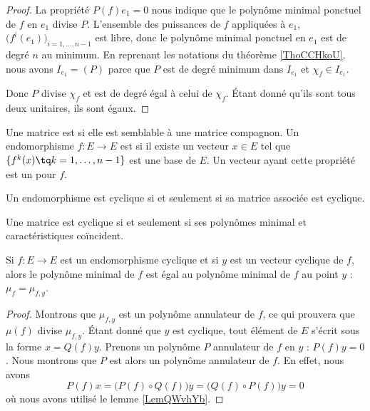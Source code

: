 \begin{proof}
    La propriété \( P(f)e_1=0\) nous indique que le polynôme minimal ponctuel de \( f\) en \( e_1\) divise \( P\). L'ensemble des puissances de \( f\) appliquées à \( e_1\), \( \big( f^i(e_1) \big)_{i=1,\ldots, n-1}\) est libre, donc le polynôme minimal ponctuel en \( e_1\) est de degré \( n\) au minimum. En reprenant les notations du théorème \ref{ThoCCHkoU}, nous avons \( I_{e_1}=(P)\) parce que \( P\) est de degré minimum dans \( I_{e_1}\) et \( \chi_f\in I_{e_1}\).

    Donc \( P\) divise \( \chi_f\) et est de degré égal à celui de \( \chi_f\). Étant donné qu'ils sont tous deux unitaires, ils sont égaux.
\end{proof}

\begin{definition}
    Une matrice est  si elle est semblable à une matrice compagnon. Un endomorphisme \( f\colon E\to E\) est  si il existe un vecteur \( x\in E\) tel que \( \{ f^k(x)\tq k=1,\ldots, n-1 \}\) est une base de \( E\). Un vecteur ayant cette propriété est un  pour \( f\).
\end{definition}

\begin{lemma}
    Un endomorphisme est cyclique si et seulement si sa matrice associée est cyclique.
\end{lemma}

\begin{lemma}   \label{LemSGmdnE}
    Une matrice est cyclique si et seulement si ses polynômes minimal et caractéristiques coïncident.
\end{lemma}

\begin{lemma}   \label{LemAGZNNa}
    Si \( f\colon E\to E\) est un endomorphisme cyclique et si \( y\) est un vecteur cyclique de \( f\), alors le polynôme minimal de \( f\) est égal au polynôme minimal de \( f\) au point \( y\) : \( \mu_{f}=\mu_{f,y}\).
\end{lemma}

\begin{proof}
    Montrons que \( \mu_{f,y}\) est un polynôme annulateur de \( f\), ce qui prouvera que \( \mu(f)\) divise \( \mu_{f,y}\). Étant donné que \( y\) est cyclique, tout élément de \( E\) s'écrit sous la forme \( x=Q(f)y\). Prenons un polynôme \( P\) annulateur de \( f\) en \( y\) : \( P(f)y=0\). Nous montrons que \( P\) est alors un polynôme annulateur de \( f\). En effet, nous avons
    \begin{equation}
        P(f)x=\big( P(f)\circ Q(f) \big)y=\big( Q(f)\circ P(f) \big)y=0
    \end{equation}
    où nous avons utilisé le lemme \ref{LemQWvhYb}.
\end{proof}

